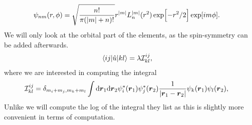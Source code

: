         \begin{align}
            \psi_{nm}(r, \phi)
            &= \sqrt{\frac{n!}{\pi(\abs{m} + n)!}}
            r^{\abs{m}} L^{\abs{m}}_n(r^2)
            \exp[-r^2/2]
            \exp[im\phi].
        \end{align}
        We will only look at the orbital part of the elements, as the
        spin-symmetry can be added afterwards.
        \begin{align}
            \mel{ij}{\hat{u}}{kl}
            &= \lambda
            \mathcal{I}^{ij}_{kl},
        \end{align}
        where we are interested in computing the integral
        \begin{align}
            \mathcal{I}^{ij}_{kl}
            &=
            \delta_{m_i + m_j, m_k + m_l}
            \int\dd \boldsymbol{r}_1\dd \boldsymbol{r}_2
            \psi_{i}^{*}(\boldsymbol{r}_1) \psi_{j}^{*}(\boldsymbol{r}_2)
            \frac{1}{\abs{\boldsymbol{r}_1 - \boldsymbol{r}_2}}
            \psi_{k}(\boldsymbol{r}_1)\psi_{l}(\boldsymbol{r}_2),
        \end{align}
        Unlike \citeauthor{anisimovas1998energy} we will compute the log of the
        integral they list as this is slightly more convenient in terms of
        computation.

